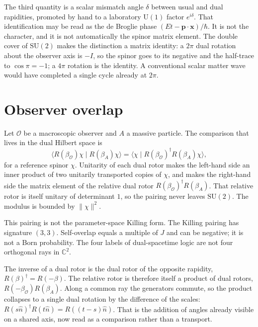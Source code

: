 \documentclass[a4paper]{article}
\begin{document}
The third quantity is a scalar mismatch angle \(\delta\) between usual and dual rapidities, promoted by hand to a laboratory \(\mathrm{U}(1)\) factor \(e^{i\delta}\). That identification may be read as the de Broglie phase \((Et-\mathbf{p}\cdot\mathbf{x})/\hbar\). It is not the character, and it is not automatically the spinor matrix element. The double cover of \(\mathrm{SU}(2)\) makes the distinction a matrix identity: a \(2\pi\) dual rotation about the observer axis is \(-I\), so the spinor goes to its negative and the half-trace to \(\cos\pi=-1\); a \(4\pi\) rotation is the identity. A conventional scalar matter wave would have completed a single cycle already at \(2\pi\).

\section{Observer overlap}

Let \(\mathcal{O}\) be a macroscopic observer and \(A\) a massive particle. The comparison that lives in the dual Hilbert space is
\[
\langle R(\beta_{\mathcal{O}})\chi\mid R(\beta_A)\chi\rangle
  =\langle\chi\mid R(\beta_{\mathcal{O}})^{\dagger}R(\beta_A)\chi\rangle,
\]
for a reference spinor \(\chi\). Unitarity of each dual rotor makes the left-hand side an inner product of two unitarily transported copies of \(\chi\), and makes the right-hand side the matrix element of the relative dual rotor \(R(\beta_{\mathcal{O}})^{\dagger}R(\beta_A)\). That relative rotor is itself unitary of determinant \(1\), so the pairing never leaves \(\mathrm{SU}(2)\). The modulus is bounded by \(\lVert\chi\rVert^2\).

This pairing is not the parameter-space Killing form. The Killing pairing has signature \((3,3)\). Self-overlap equals a multiple of \(J\) and can be negative; it is not a Born probability. The four labels of dual-spacetime logic are not four orthogonal rays in \(\mathbb{C}^2\).

The inverse of a dual rotor is the dual rotor of the opposite rapidity, \(R(\beta)^{\dagger}=R(-\beta)\). The relative rotor is therefore itself a product of dual rotors, \(R(-\beta_{\mathcal{O}})R(\beta_A)\). Along a common ray the generators commute, so the product collapses to a single dual rotation by the difference of the scales: \(R(s\hat n)^{\dagger}R(t\hat n)=R((t-s)\hat n)\). That is the addition of angles already visible on a shared axis, now read as a comparison rather than a transport.
\end{document}
